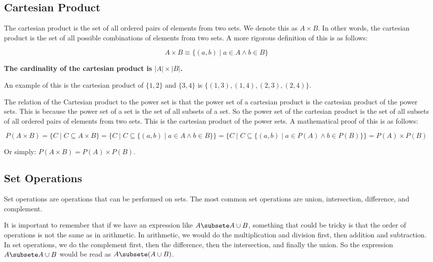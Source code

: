 \documentclass[11pt]{article}
\begin{document}
\subsection{Cartesian Product}
\label{sec:org6767bdc}
The cartesian product is the set of all ordered pairs of elements from two sets. We denote this as \(A \times B\). In other words, the cartesian product is the set of all possible combinations of elements from two sets. A more rigorous definition of this is as follows:

\[
A \times B \equiv \{(a,b) \mid a \in A \land b \in B\}
\]

\textbf{The cardinality of the cartesian product is \(|A| \times |B|\).}

An example of this is the cartesian product of \(\{1,2\}\) and \(\{3,4\}\) is \(\{(1,3), (1,4), (2,3), (2,4)\}\).

The relation of the Cartesian product to the power set is that the power set of a cartesian product is the cartesian product of the power sets. This is because the power set of a set is the set of all subsets of a set. So the power set of the cartesian product is the set of all subsets of all ordered pairs of elements from two sets. This is the cartesian product of the power sets. A mathematical proof of this is as follows:

\[
P(A \times B) = \{C \mid C \subseteq A \times B\} = \{C \mid C \subseteq \{(a,b) \mid a \in A \land b \in B\}\} = \{C \mid C \subseteq \{(a,b) \mid a \in P(A) \land b \in P(B)\}\} = P(A) \times P(B)
\]

Or simply: \(P(A \times B) = P(A) \times P(B)\).

\subsection{Set Operations}
\label{sec:orga1ad14c}
Set operations are operations that can be performed on sets. The most common set operations are union, intersection, difference, and complement.

It is important to remember that if we have an expression like \(A \subsete A \cup B\), something that could be tricky is that the order of operations is not the same as in arithmetic. In arithmetic, we would do the multiplication and division first, then addition and subtraction. In set operations, we do the complement first, then the difference, then the intersection, and finally the union. So the expression \(A \subsete A \cup B\) would be read as \(A \subsete (A \cup B)\).
\end{document}
